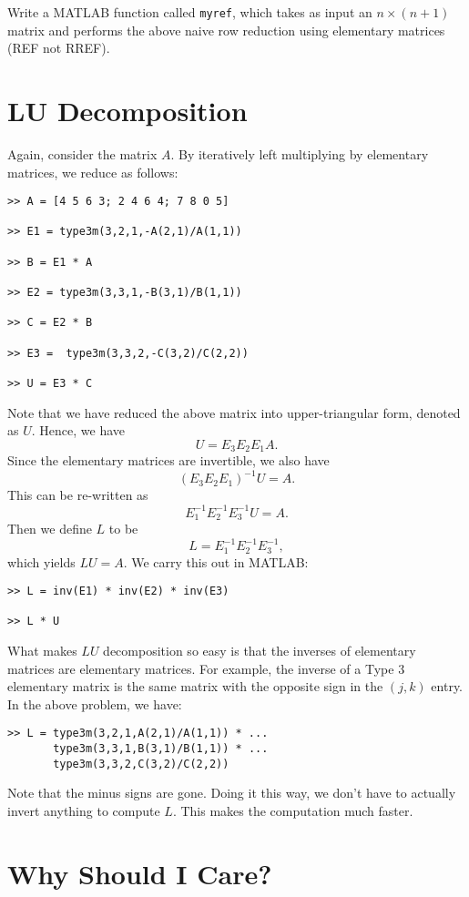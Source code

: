 \begin{problem}
Write a MATLAB function called {\tt myref}, which takes as input an
$n\times (n+1)$ matrix and performs the above naive row reduction
using elementary matrices (REF not RREF).
\end{problem}

\section*{LU Decomposition}

Again, consider the matrix $A$. By iteratively left multiplying by
elementary matrices, we reduce as follows:

\begin{verbatim}
>> A = [4 5 6 3; 2 4 6 4; 7 8 0 5]

>> E1 = type3m(3,2,1,-A(2,1)/A(1,1))

>> B = E1 * A

>> E2 = type3m(3,3,1,-B(3,1)/B(1,1))

>> C = E2 * B

>> E3 =  type3m(3,3,2,-C(3,2)/C(2,2))

>> U = E3 * C
\end{verbatim}
Note that we have reduced the above matrix into upper-triangular
form, denoted as $U$.  Hence, we have
\[
U = E_3 E_2 E_1 A.
\]
Since the elementary matrices are invertible, we also have
\[
(E_3 E_2 E_1)^{-1} U =  A.
\]
This can be re-written as
\[
E_1^{-1} E_2^{-1} E_3^{-1} U =  A.
\]
Then we define $L$ to be
\[
L = E_1^{-1} E_2^{-1} E_3^{-1},
\]
which yields $L U = A$.  We carry this out in MATLAB:
\begin{verbatim}
>> L = inv(E1) * inv(E2) * inv(E3)

>> L * U
\end{verbatim}
What makes $LU$ decomposition so easy is that the inverses of
elementary matrices are elementary matrices.  For example, the
inverse of a Type 3 elementary matrix is the same matrix with the
opposite sign in the $(j,k)$ entry.  In the above problem, we have:
\begin{verbatim}
>> L = type3m(3,2,1,A(2,1)/A(1,1)) * ...
       type3m(3,3,1,B(3,1)/B(1,1)) * ...
       type3m(3,3,2,C(3,2)/C(2,2))
\end{verbatim}
Note that the minus signs are gone.  Doing it this way, we don't
have to actually invert anything to compute $L$.  This makes the
computation much faster.

\section*{Why Should I Care?}

